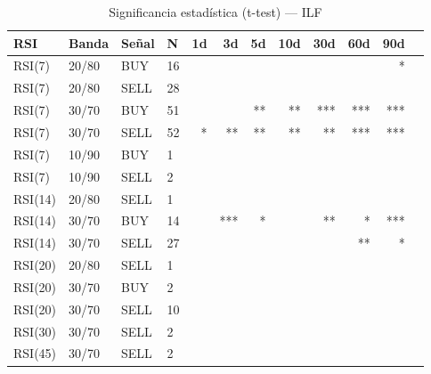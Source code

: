 %
\begin{table}[htbp]
    \centering
    \caption{Significancia estadística (t-test) --- ILF}
    \label{tab:sig_ilf}
    \small
    \begin{tabular}{llllrrrrrrrr}
        \toprule
        \textbf{RSI} & \textbf{Banda} & \textbf{Se\~{n}al} & \textbf{N} & \textbf{1d} & \textbf{3d} & \textbf{5d} & \textbf{10d} & \textbf{30d} & \textbf{60d} & \textbf{90d} \\
        \midrule
        RSI(7) & 20/80 & BUY & 16 &  &  &  &  &  &  & * \\
        RSI(7) & 20/80 & SELL & 28 &  &  &  &  &  &  &  \\
        RSI(7) & 30/70 & BUY & 51 &  &  & ** & ** & *** & *** & *** \\
        RSI(7) & 30/70 & SELL & 52 & * & ** & ** & ** & ** & *** & *** \\
        RSI(7) & 10/90 & BUY & 1 &  &  &  &  &  &  &  \\
        RSI(7) & 10/90 & SELL & 2 &  &  &  &  &  &  &  \\
        \midrule
        RSI(14) & 20/80 & SELL & 1 &  &  &  &  &  &  &  \\
        RSI(14) & 30/70 & BUY & 14 &  & *** & * &  & ** & * & *** \\
        RSI(14) & 30/70 & SELL & 27 &  &  &  &  &  & ** & * \\
        \midrule
        RSI(20) & 20/80 & SELL & 1 &  &  &  &  &  &  &  \\
        RSI(20) & 30/70 & BUY & 2 &  &  &  &  &  &  &  \\
        RSI(20) & 30/70 & SELL & 10 &  &  &  &  &  &  &  \\
        \midrule
        RSI(30) & 30/70 & SELL & 2 &  &  &  &  &  &  &  \\
        \midrule
        RSI(45) & 30/70 & SELL & 2 &  &  &  &  &  &  &  \\
        \bottomrule
    \end{tabular}
\end{table}
